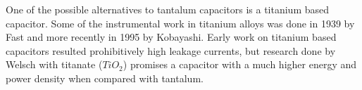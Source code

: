 One of the possible alternatives to tantalum capacitors is a titanium based capacitor. Some of the instrumental work in titanium alloys was done in 1939 by Fast\cite{fast1939transition} and more recently in 1995 by Kobayashi.\cite{kobayashi1995mechanical}\cite{corwin2013synthesis} Early work on titanium based capacitors resulted prohibitively high leakage currents\cite{ki2005titanium}, but research done by Welsch\cite{welsch22nd} with titanate ($TiO_2$) promises a capacitor with a much higher energy and power density when compared with tantalum.\cite{steve_thesis}

